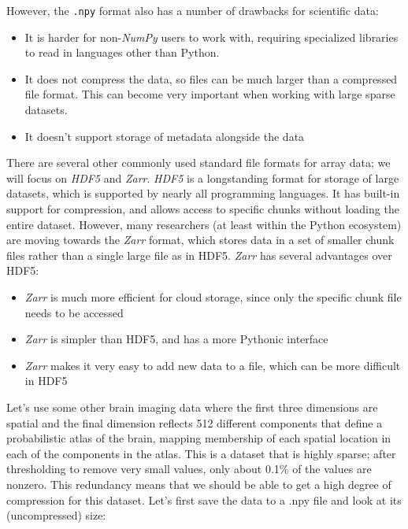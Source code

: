 However, the \texttt{.npy} format also has a number of drawbacks for scientific data:

\begin{itemize}
\item It is harder for non-\textit{NumPy} users to work with, requiring specialized libraries to read in languages other than Python.
\item It does not compress the data, so files can be much larger than a compressed file format. This can become very important when working with large sparse datasets.
\item It doesn't support storage of metadata alongside the data
\end{itemize}

There are several other commonly used standard file formats for array data; we will focus on \textit{HDF5} and \textit{Zarr}. \textit{HDF5} is a longstanding format for storage of large datasets, which is supported by nearly all programming languages. It has built-in support for compression, and allows access to specific chunks without loading the entire dataset.  However, many researchers (at least within the Python ecosystem) are moving towards the \textit{Zarr} format, which stores data in a set of smaller chunk files rather than a single large file as in HDF5.  \textit{Zarr} has several advantages over HDF5:

\begin{itemize}
\item \textit{Zarr} is much more efficient for cloud storage, since only the specific chunk file needs to be accessed
\item \textit{Zarr} is simpler than HDF5, and has a more Pythonic interface
\item \textit{Zarr} makes it very easy to add new data to a file, which can be more difficult in HDF5
\end{itemize}

Let's use some other brain imaging data where the first three dimensions are spatial and the final
dimension reflects 512 different components that define a probabilistic atlas of the brain, mapping membership of each spatial location in each of the components in the atlas.  This is a dataset that is highly sparse; after thresholding to remove very small values, only about 0.1\% of the values are nonzero.  This redundancy means that we should be able to get a high degree of compression for this dataset.  Let's first save the data to a .npy file and look at its (uncompressed) size:

